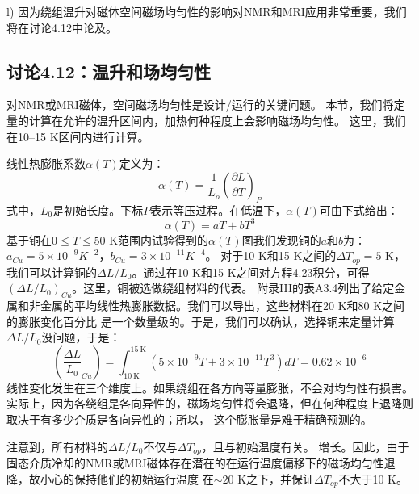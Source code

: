 l) 因为绕组温升对磁体空间磁场均匀性的影响对NMR和MRI应用非常重要，我们将在讨论4.12中论及。



\subsection{讨论4.12：温升和场均匀性}
对NMR或MRI磁体，空间磁场均匀性是设计/运行的关键问题。
本节，我们将定量的计算在允许的温升区间内，加热何种程度上会影响磁场均匀性。
这里，我们在10–15 K区间内进行计算。

线性热膨胀系数$\alpha(T)$定义为：
\begin{equation}%
\alpha(T)=\frac{1}{L_o}(\frac{\partial L}{\partial T})_P
\end{equation}
式中，$L_0$是初始长度。下标$P$表示等压过程。在低温下，$\alpha(T)$可由下式给出：
\begin{equation}%
\alpha(T)=aT+bT^3
\end{equation}
基于铜在$0\le T\le 50$ K范围内试验得到的$\alpha(T)$图我们发现铜的$a$和$b$为：
$a_{Cu}= 5\times 10^{-9} K^{−2}$，$b_{Cu} = 3\times 10^{−11} K^{−4}$。
对于10 K和15 K之间的$\Delta T_{op} = 5$ K，我们可以计算铜的$\Delta L/L_0$。通过在10 K和15 K之间对方程4.23积分，可得
$(\Delta L/L_0)_{Cu}$。这里，铜被选做绕组材料的代表。
附录III的表A3.4列出了给定金属和非金属的平均线性热膨胀数据。我们可以导出，这些材料在20 K和80 K之间的膨胀变化百分比
是一个数量级的。于是，我们可以确认，选择铜来定量计算$\Delta L/L_0$没问题，于是：
\begin{equation}%
(\frac{\Delta L}{L_0}_{Cu})=\int_{10\ \mathrm{K}}^{15\ \mathrm{K}}(5\times 10^{-9}T+3\times 10^{-11}T^3)dT=0.62\times 10^{-6}
\end{equation}
线性变化发生在三个维度上。如果绕组在各方向等量膨胀，不会对均匀性有损害。
实际上，因为各绕组是各向异性的，磁场均匀性将会退降，但在何种程度上退降则取决于有多少介质是各向异性的；所以，
这个膨胀量是难于精确预测的。

注意到，所有材料的$\Delta L/L_0$不仅与$\Delta T_{op}$，且与初始温度有关。
增长。因此，由于固态介质冷却的NMR或MRI磁体存在潜在的在运行温度偏移下的磁场均匀性退降，故小心的保持他们的初始运行温度
在$\sim 20$ K之下，并保证$\Delta T_{op}$不大于10 K。

